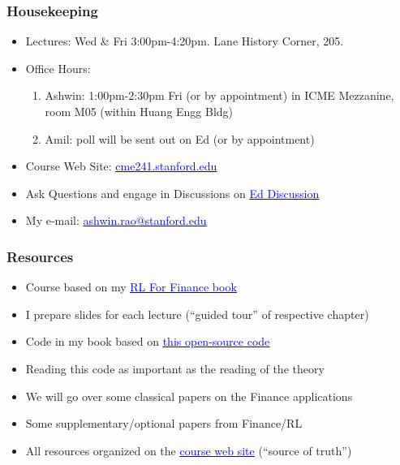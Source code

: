 \documentclass[handout]{beamer}
\begin{document}
\begin{frame}
\frametitle{Housekeeping}
\pause
\begin{itemize}[<+->]
\item Lectures: Wed \& Fri 3:00pm-4:20pm. Lane History Corner, 205.
\item Office Hours:
\begin{enumerate}
	\item  Ashwin: 1:00pm-2:30pm Fri (or by appointment) in ICME Mezzanine, room M05 (within Huang Engg Bldg)
	\item  Amil: poll will be sent out on Ed (or by appointment)
\end{enumerate}
\item Course Web Site: \href{http://cme241.stanford.edu}{\underline{\textcolor{blue}{cme241.stanford.edu}}}
\item Ask Questions and engage in Discussions on \href{https://edstem.org/us/courses/31295}{\underline{\textcolor{blue}{Ed Discussion}}}
\item My e-mail: \href{mailto:ashwin.rao@stanford.edu}{\underline{\textcolor{blue}{ashwin.rao@stanford.edu}}}
\end{itemize}
\end{frame}


\begin{frame}
\frametitle{Resources}
\pause
\begin{itemize}[<+->]
\item Course based on my \href{http://stanford.edu/~ashlearn/RLForFinanceBook/book.pdf}{\underline{\textcolor{blue}{RL For Finance book}}}
\item I prepare slides for each lecture (``guided tour'' of respective chapter)
\item Code in my book based on \href{https://github.com/TikhonJelvis/RL-Book}{\underline{\textcolor{blue}{this open-source code}}}
\item Reading this code as important as the reading of the theory 
\item We will go over some classical papers on the Finance applications
\item Some supplementary/optional papers from Finance/RL
\item All resources organized on the \href{http://cme241.stanford.edu}{\underline{\textcolor{blue}{course web site}}} (``source of truth'')
\end{itemize}
\end{frame}
\end{document}

